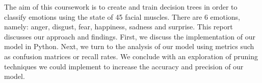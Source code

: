 The aim of this coursework is to create and train decision trees in order to classify emotions using the state of 45 facial muscles.
There are 6 emotions, namely: anger, disgust, fear, happiness, sadness and surprise.
This report discusses our approach and findings. 
First,  we discuss the implementation of our model in Python.
Next, we turn to the analysis of our model using metrics such as confusion matrices or recall rates.
We conclude with an exploration of pruning techniques we could implement to increase the accuracy and precision of our model.

